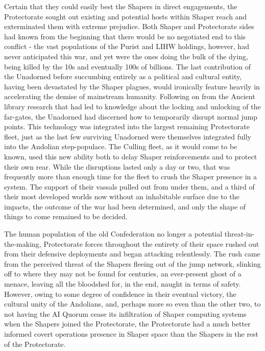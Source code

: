 Certain that they could easily best the Shapers in direct engagements,
the Protectorate sought out existing and potential hosts within Shaper
reach and exterminated them with extreme prejudice. Both Shaper and
Protectorate sides had known from the beginning that there would be no
negotiated end to this conflict - the vast populations of the Purist
and LIHW holdings, however, had never anticipated this war, and yet
were the ones doing the bulk of the dying, being killed by the 10s and
eventually 100s of billions. The last contribution of the Unadorned
before succumbing entirely as a political and cultural entity, having
been devastated by the Shaper plagues, would ironically feature
heavily in accelerating the demise of mainstream humanity. Following
on from the Ancient library research that had led to knowledge about
the locking and unlocking of the far-gates, the Unadorned had
discerned how to temporarily disrupt normal jump points. This
technology was integrated into the largest remaining Protectorate
fleet, just as the last few surviving Unadorned were themselves
integrated fully into the Andolian step-populace. The Culling fleet,
as it would come to be known, used this new ability both to delay
Shaper reinforcements and to protect their own rear. While the
disruptions lasted only a day or two, that was frequently more than
enough time for the fleet to crush the Shaper presence in a
system. The support of their vassals pulled out from under them, and a
third of their most developed worlds now without an inhabitable
surface due to the impacts, the outcome of the war had been
determined, and only the shape of things to come remained to be
decided.

The human population of the old Confederation no longer a potential
threat-in-the-making, Protectorate forces throughout the entirety of
their space rushed out from their defensive deployments and began
attacking relentlessly. The rush came from the perceived threat of the
Shapers fleeing out of the jump network, slinking off to where they
may not be found for centuries, an ever-present ghost of a menace,
leaving all the bloodshed for, in the end, naught in terms of
safety. However, owing to some degree of confidence in their eventual
victory, the cultural unity of the Andolians, and, perhaps more so even
than the other two, to not having the AI Quorum cease its infiltration
of Shaper computing systems when the Shapers joined the Protectorate,
the Protectorate had a much better informed covert operations presence
in Shaper space than the Shapers in the rest of the Protectorate.

